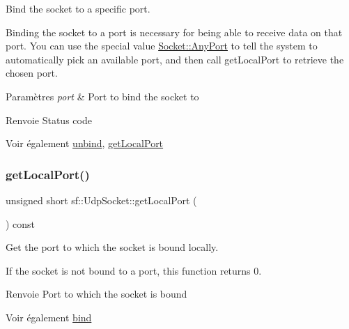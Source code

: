 Bind the socket to a specific port. 

Binding the socket to a port is necessary for being able to receive data on that port. You can use the special value \hyperlink{classsf_1_1Socket_a5deb2c955fd347259c3a20d27b2481aaa5a3c30fd128895403afc11076f461b19}{Socket\+::\+Any\+Port} to tell the system to automatically pick an available port, and then call get\+Local\+Port to retrieve the chosen port.


\begin{DoxyParams}{Paramètres}
{\em port} & Port to bind the socket to\\
\hline
\end{DoxyParams}
\begin{DoxyReturn}{Renvoie}
Status code
\end{DoxyReturn}
\begin{DoxySeeAlso}{Voir également}
\hyperlink{classsf_1_1UdpSocket_a2c4abb8102a1bd31f51fcfe7f15427a3}{unbind}, \hyperlink{classsf_1_1UdpSocket_a5c03644b3da34bb763bce93e758c938e}{get\+Local\+Port} 
\end{DoxySeeAlso}
\mbox{\label{classsf_1_1UdpSocket_a5c03644b3da34bb763bce93e758c938e}} 
\subsubsection{\texorpdfstring{get\+Local\+Port()}{getLocalPort()}}
{\footnotesize\ttfamily unsigned short sf\+::\+Udp\+Socket\+::get\+Local\+Port (\begin{DoxyParamCaption}{ }\end{DoxyParamCaption}) const}



Get the port to which the socket is bound locally. 

If the socket is not bound to a port, this function returns 0.

\begin{DoxyReturn}{Renvoie}
Port to which the socket is bound
\end{DoxyReturn}
\begin{DoxySeeAlso}{Voir également}
\hyperlink{classsf_1_1UdpSocket_ab0bf8d32849836f92beb2fd734565481}{bind} 
\end{DoxySeeAlso}
\mbox{\label{classsf_1_1UdpSocket_ade9ca0f7ed7919136917b0b997a9833a}} 
